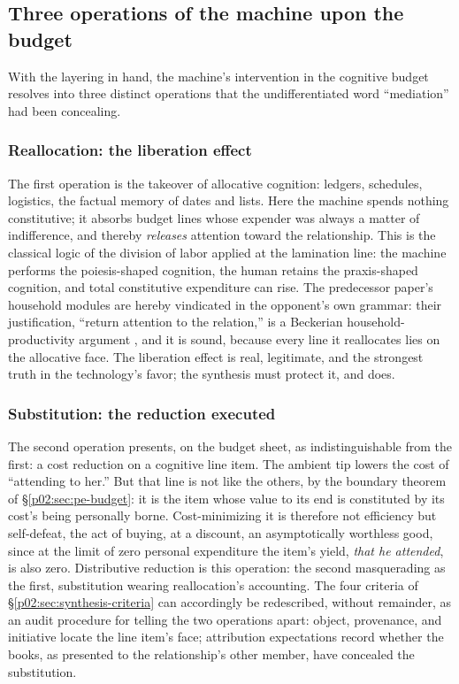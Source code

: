 \documentclass[11pt,a4paper]{article}
\begin{document}
\subsection{Three operations of the machine upon the budget}
\label{p02:sec:pe-operations}

With the layering in hand, the machine's intervention in the cognitive budget resolves into three distinct operations that the undifferentiated word ``mediation'' had been concealing.

\subsubsection{Reallocation: the liberation effect}
\label{p02:sec:pe-reallocation}

The first operation is the takeover of allocative cognition: ledgers, schedules, logistics, the factual memory of dates and lists. Here the machine spends nothing constitutive; it absorbs budget lines whose expender was always a matter of indifference, and thereby \emph{releases} attention toward the relationship. This is the classical logic of the division of labor applied at the lamination line: the machine performs the poiesis-shaped cognition, the human retains the praxis-shaped cognition, and total constitutive expenditure can rise. The predecessor paper's household modules are hereby vindicated in the opponent's own grammar: their justification, ``return attention to the relation,'' is a Beckerian household-productivity argument \parencite{becker1965theory,becker1981treatise}, and it is sound, because every line it reallocates lies on the allocative face. The liberation effect is real, legitimate, and the strongest truth in the technology's favor; the synthesis must protect it, and does.

\subsubsection{Substitution: the reduction executed}
\label{p02:sec:pe-substitution}

The second operation presents, on the budget sheet, as indistinguishable from the first: a cost reduction on a cognitive line item. The ambient tip lowers the cost of ``attending to her.'' But that line is not like the others, by the boundary theorem of \S\ref{p02:sec:pe-budget}: it is the item whose value to its end is constituted by its cost's being personally borne. Cost-minimizing it is therefore not efficiency but self-defeat, the act of buying, at a discount, an asymptotically worthless good, since at the limit of zero personal expenditure the item's yield, \emph{that he attended}, is also zero. Distributive reduction is this operation: the second masquerading as the first, substitution wearing reallocation's accounting. The four criteria of \S\ref{p02:sec:synthesis-criteria} can accordingly be redescribed, without remainder, as an audit procedure for telling the two operations apart: object, provenance, and initiative locate the line item's face; attribution expectations record whether the books, as presented to the relationship's other member, have concealed the substitution.
\end{document}
